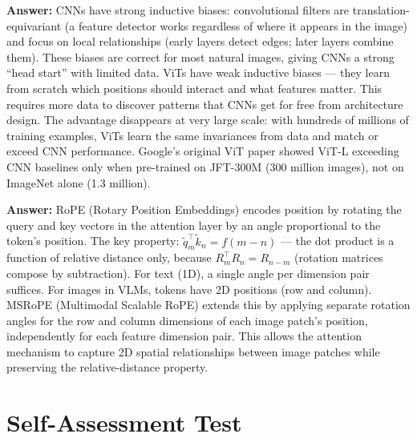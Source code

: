 \documentclass[11pt, a4paper]{article}
\begin{document}
\begin{notebox}
\textbf{Answer:} CNNs have strong inductive biases: convolutional filters are translation-equivariant (a feature detector works regardless of where it appears in the image) and focus on local relationships (early layers detect edges; later layers combine them). These biases are correct for most natural images, giving CNNs a strong ``head start'' with limited data. ViTs have weak inductive biases --- they learn from scratch which positions should interact and what features matter. This requires more data to discover patterns that CNNs get for free from architecture design. The advantage disappears at very large scale: with hundreds of millions of training examples, ViTs learn the same invariances from data and match or exceed CNN performance. Google's original ViT paper showed ViT-L exceeding CNN baselines only when pre-trained on JFT-300M (300 million images), not on ImageNet alone (1.3 million).
\end{notebox}

\begin{notebox}
\textbf{Answer:} RoPE (Rotary Position Embeddings) encodes position by rotating the query and key vectors in the attention layer by an angle proportional to the token's position. The key property: $\tilde{q}_m^\top \tilde{k}_n = f(m-n)$ --- the dot product is a function of relative distance only, because $R_m^\top R_n = R_{n-m}$ (rotation matrices compose by subtraction). For text (1D), a single angle per dimension pair suffices. For images in VLMs, tokens have 2D positions (row and column). MSRoPE (Multimodal Scalable RoPE) extends this by applying separate rotation angles for the row and column dimensions of each image patch's position, independently for each feature dimension pair. This allows the attention mechanism to capture 2D spatial relationships between image patches while preserving the relative-distance property.
\end{notebox}

\newpage
\section{Self-Assessment Test}
\end{document}
